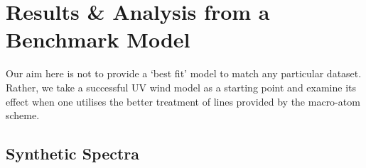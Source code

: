 \documentclass[preprint, a4paper, 11pt]{aastex}
\begin{document}
\section{Results \& Analysis from a Benchmark Model}


Our aim here is not
to provide a `best fit' model to match any particular dataset.
Rather, we take
a successful UV wind model as a starting point
and examine its effect 
when one utilises the better treatment of lines provided
by the macro-atom scheme.


\subsection{Synthetic Spectra}
\end{document}
